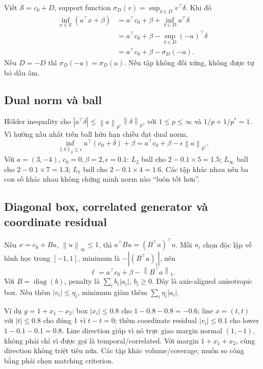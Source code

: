 \documentclass[11pt,a4paper]{article}
\newcommand{\norm}[1]{\left\lVert#1\right\rVert}
\newcommand{\diag}{\operatorname{diag}}
\newcommand{\Sset}{\mathcal S}
\theoremstyle{definition}
\begin{document}
Viết $\Sset=c_0+D$, support function
$\sigma_D(v)=\sup_{\delta\in D}v^\top\delta$. Khi đó
\begin{align}
\inf_{x\in\Sset}(a^\top x+\beta)
&=a^\top c_0+\beta+\inf_{\delta\in D}a^\top\delta\\
&=a^\top c_0+\beta-\sup_{\delta\in D}(-a)^\top\delta\\
&=a^\top c_0+\beta-\sigma_D(-a).
\end{align}
Nếu $D=-D$ thì $\sigma_D(-a)=\sigma_D(a)$. Nếu tập không đối xứng, không
được tự bỏ dấu âm.

\subsection{Dual norm và ball}
Hölder inequality cho $|a^\top\delta|\le\norm{a}_{p^*}\norm{\delta}_p$,
với $1\le p\le\infty$ và $1/p+1/p^*=1$. Vì hướng xấu nhất trên ball hữu
hạn chiều đạt dual norm,
\begin{equation}
\inf_{\norm{\delta}_p\le\epsilon}a^\top(c_0+\delta)+\beta
=a^\top c_0+\beta-\epsilon\norm{a}_{p^*}.
\end{equation}
Với $a=(3,-4)$, $c_0=0,\beta=2,\epsilon=0.1$:
$L_2$ ball cho $2-0.1\times5=1.5$;
$L_\infty$ ball cho $2-0.1\times7=1.3$;
$L_1$ ball cho $2-0.1\times4=1.6$. Các tập khác nhau nên ba con số khác nhau
không chứng minh norm nào ``luôn tốt hơn''.

\subsection{Diagonal box, correlated generator và coordinate residual}
Nếu $x=c_0+Bu$, $\norm{u}_\infty\le1$, thì
$a^\top Bu=(B^\top a)^\top u$. Mỗi $u_i$ chọn độc lập về hình học trong
$[-1,1]$, minimum là $-|(B^\top a)_i|$, nên
\begin{equation}
\ell=a^\top c_0+\beta-\norm{B^\top a}_1.
\end{equation}
Với $B=\diag(b)$, penalty là $\sum_i b_i|a_i|$, $b_i\ge0$. Đây là
axis-aligned anisotropic box. Nếu thêm $|v_i|\le\eta_i$, minimum giảm
thêm $\sum_i\eta_i|a_i|$.

Ví dụ $g=1+x_1-x_2$: box $|x_i|\le0.8$ cho $1-0.8-0.8=-0.6$;
line $x=(t,t)$ với $|t|\le0.8$ cho đúng 1 vì $t-t=0$;
thêm coordinate residual $|v_i|\le0.1$ cho lower $1-0.1-0.1=0.8$.
Line direction giúp vì nó trực giao margin normal $(1,-1)$, không phải
chỉ vì được gọi là temporal/correlated. Với margin $1+x_1+x_2$, cùng
direction không triệt tiêu nữa. Các tập khác volume/coverage; muốn so công
bằng phải chọn matching criterion.
\end{document}
